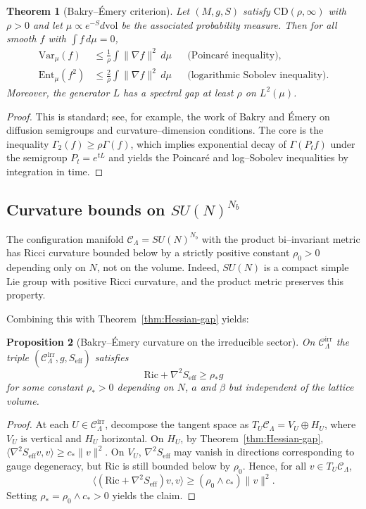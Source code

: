 \documentclass[11pt]{article}
\numberwithin{equation}{section}
\newtheorem{theorem}{Theorem}[section]
\newtheorem{proposition}[theorem]{Proposition}
\begin{document}
\begin{theorem}[Bakry--\'Emery criterion]
\label{thm:BE}
Let $(M,g,S)$ satisfy $\mathrm{CD}(\rho,\infty)$ with $\rho>0$ and let
$\mu\propto e^{-S}d\mathrm{vol}$ be the associated probability measure.
Then for all smooth $f$ with $\int f\,d\mu=0$,
\begin{align*}
  \mathrm{Var}_\mu(f)
   &\le \frac{1}{\rho}\int \|\nabla f\|^2\,d\mu
     &&\text{(Poincar\'e inequality)},\\
  \mathrm{Ent}_\mu(f^2)
   &\le \frac{2}{\rho}\int \|\nabla f\|^2\,d\mu
     &&\text{(logarithmic Sobolev inequality)}.
\end{align*}
Moreover, the generator $L$ has a spectral gap at least $\rho$ on
$L^2(\mu)$.
\end{theorem}

\begin{proof}
This is standard; see, for example, the work of Bakry and \'Emery on
diffusion semigroups and curvature--dimension conditions.  The core is
the inequality $\Gamma_2(f)\ge\rho\Gamma(f)$, which implies exponential
decay of $\Gamma(P_t f)$ under the semigroup $P_t=e^{tL}$ and yields the
Poincar\'e and log--Sobolev inequalities by integration in time.
\end{proof}

\subsection{Curvature bounds on $SU(N)^{N_b}$}

The configuration manifold $\mathcal{C}_\Lambda = SU(N)^{N_b}$ with the
product bi--invariant metric has Ricci curvature bounded below by a
strictly positive constant $\rho_0>0$ depending only on $N$, not on the
volume.  Indeed, $SU(N)$ is a compact simple Lie group with positive
Ricci curvature, and the product metric preserves this property.

Combining this with Theorem~\ref{thm:Hessian-gap} yields:

\begin{proposition}[Bakry--\'Emery curvature on the irreducible sector]
\label{prop:BE-lattice}
On $\mathcal{C}_\Lambda^{\mathrm{irr}}$ the triple
$(\mathcal{C}_\Lambda^{\mathrm{irr}},g,S_{\mathrm{eff}})$ satisfies
\[
  \mathrm{Ric} + \nabla^2 S_{\mathrm{eff}} \ge \rho_* g
\]
for some constant $\rho_*>0$ depending on $N$, $a$ and $\beta$ but
independent of the lattice volume.
\end{proposition}

\begin{proof}
At each $U\in\mathcal{C}_\Lambda^{\mathrm{irr}}$, decompose the tangent
space as $T_U\mathcal{C}_\Lambda = V_U\oplus H_U$, where $V_U$ is
vertical and $H_U$ horizontal.  On $H_U$, by
Theorem~\ref{thm:Hessian-gap},
$\langle\nabla^2 S_{\mathrm{eff}} v,v\rangle\ge c_*\|v\|^2$.  On $V_U$,
$\nabla^2 S_{\mathrm{eff}}$ may vanish in directions corresponding to
gauge degeneracy, but $\mathrm{Ric}$ is still bounded below by $\rho_0$.
Hence, for all $v\in T_U\mathcal{C}_\Lambda$,
\[
  \langle(\mathrm{Ric}+\nabla^2 S_{\mathrm{eff}})v,v\rangle
  \ge (\rho_0\wedge c_*)\|v\|^2.
\]
Setting $\rho_* = \rho_0\wedge c_*>0$ yields the claim.
\end{proof}
\end{document}
